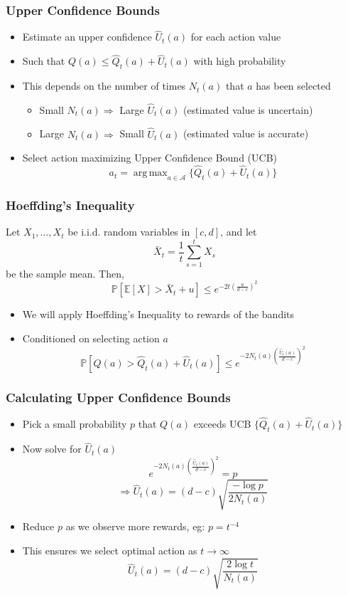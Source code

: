 \documentclass[handout]{beamer}
\DeclareMathOperator*{\argmax}{arg\,max}
\begin{document}
\begin{frame}
\frametitle{Upper Confidence Bounds}
\pause
\begin{itemize}[<+->]
\item Estimate an upper confidence $\hat{U}_t(a)$ for each action value
\item Such that $Q(a) \leq \hat{Q}_t(a) + \hat{U}_t(a)$ with high probability
\item This depends on the number of times $N_t(a)$ that $a$ has been selected
\begin{itemize}
\item Small $N_t(a) \Rightarrow$ Large $\hat{U}_t(a)$ (estimated value is uncertain)
\item Large $N_t(a) \Rightarrow$ Small $\hat{U}_t(a)$ (estimated value is accurate)
\end{itemize}
\item Select action maximizing Upper Confidence  Bound (UCB)
$$a_t = \argmax_{a\in\mathcal{A}} \{ \hat{Q}_t(a) + \hat{U}_t(a) \}$$
\end{itemize}
\end{frame}

\begin{frame}
\frametitle{Hoeffding's Inequality}
\pause
\begin{theorem}
Let $X_1, \ldots, X_t$ be i.i.d. random variables in $[c,d]$, and let $$\bar{X}_t = \frac 1 t \sum_{s=1}^t X_s$$ be the sample mean. Then,
$$\mathbb{P}[\mathbb{E}[X] > \bar{X}_t + u] \leq e^{-2t(\frac u {d-c})^2}$$
\end{theorem}
\begin{itemize}[<+->]
\item We will apply Hoeffding's Inequality to rewards of the bandits
\item Conditioned on selecting action $a$
$$\mathbb{P}[Q(a) > \hat{Q}_t(a) + \hat{U}_t(a)] \leq e^{-2N_t(a)(\frac {\hat{U}_t(a)} {d-c})^2}$$
\end{itemize}
\end{frame}



\begin{frame}
\frametitle{Calculating Upper Confidence Bounds}
\pause
\begin{itemize}[<+->]
\item Pick a small probability $p$ that $Q(a)$ exceeds UCB $\{\hat{Q}_t(a) + \hat{U}_t(a)\}$
\item Now solve for $\hat{U}_t(a)$
$$e^{-2N_t(a)(\frac {\hat{U}_t(a)} {d-c})^2} = p$$
$$\Rightarrow \hat{U}_t(a) = (d-c)\sqrt{\frac {-\log p} {2 N_t(a)}}$$
\item Reduce $p$ as we observe more rewards, eg: $p = t^{-4}$
\item This ensures we select optimal action as $t\rightarrow \infty$
$$\hat{U}_t(a) = (d-c)\sqrt{\frac {2 \log t} {N_t(a)}}$$
\end{itemize}
\end{frame}
\end{document}
